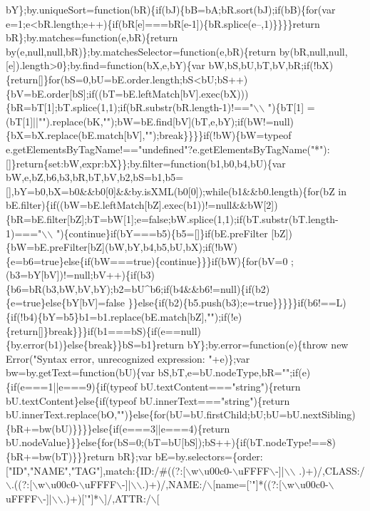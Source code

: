 \begin{DoxyCode}
{       bY\};by.uniqueSort=function(bR)\{if(bJ)\{bB=bA;bR.sort(bJ);if(bB)\{for(var e=1;e<bR.length;e++)\{if(bR[e]===bR[e-1])\{bR.splice(e--,1)\}\}\}\}return
       bR\};by.matches=function(e,bR)\{return by(e,null,null,bR)\};by.matchesSelector=function(e,bR)\{return
       by(bR,null,null,[e]).length>0\};by.find=function(bX,e,bY)\{var
       bW,bS,bU,bT,bV,bR;if(!bX)\{return[]\}for(bS=0,bU=bE.order.length;bS<bU;bS++)\{bV=bE.order[bS];if((bT=bE.leftMatch[bV].exec(bX)))\{bR=bT[1];bT.splice(1,1);if(bR.substr(bR.length-1)!=="\(\backslash\)\(\backslash\)
      ")\{bT[1]
      =(bT[1]||"").replace(bK,"");bW=bE.find[bV](bT,e,bY);if(bW!=null)\{bX=bX.replace(bE.match[bV],"");break\}\}\}\}if(!bW)\{bW=typeof
       e.getElementsByTagName!=="undefined"?e.getElementsByTagName("*"):[]\}return\{set:bW,expr:bX\}\};by.filter=function(b1,b0,b4,bU)\{var
       bW,e,bZ,b6,b3,bR,bT,bV,b2,bS=b1,b5=[],bY=b0,bX=b0&&b0[0]&&by.isXML(b0[0]);while(b1&&b0.length)\{for(bZ in
       bE.filter)\{if((bW=bE.leftMatch[bZ].exec(b1))!=null&&bW[2])\{bR=bE.filter[bZ];bT=bW[1];e=false;bW.splice(1,1);if(bT.substr(bT.length-1)==="\(\backslash\)\(\backslash\)
      ")\{continue\}if(bY===b5)\{b5=[]\}if(bE.preFilter
      [bZ])\{bW=bE.preFilter[bZ](bW,bY,b4,b5,bU,bX);if(!bW)\{e=b6=true\}else\{if(bW===true)\{continue\}\}\}if(bW)\{for(bV=0
      ;(b3=bY[bV])!=null;bV++)\{if(b3)\{b6=bR(b3,bW,bV,bY);b2=bU^b6;if(b4&&b6!=null)\{if(b2)\{e=true\}else\{bY[bV]=false
      \}\}else\{if(b2)\{b5.push(b3);e=true\}\}\}\}\}if(b6!==L)\{if(!b4)\{bY=b5\}b1=b1.replace(bE.match[bZ],"");if(!e)\{return[]\}break\}\}\}if(b1===bS)\{if(e==null)\{by.error(b1)\}else\{break\}\}bS=b1\}return bY\};by.error=function(e)\{throw new
       Error("Syntax error, unrecognized expression: "+e)\};var bw=by.getText=function(bU)\{var
       bS,bT,e=bU.nodeType,bR="";if(e)\{if(e===1||e===9)\{if(typeof bU.textContent==="string")\{return bU.textContent\}else\{if(typeof
       bU.innerText==="string")\{return
       bU.innerText.replace(bO,"")\}else\{for(bU=bU.firstChild;bU;bU=bU.nextSibling)\{bR+=bw(bU)\}\}\}\}else\{if(e===3||e===4)\{return
       bU.nodeValue\}\}\}else\{for(bS=0;(bT=bU[bS]);bS++)\{if(bT.nodeType!==8)\{bR+=bw(bT)\}\}\}return bR\};var bE=by.selectors=\{order:["ID","NAME","TAG"],match:\{ID:/#((?:[\(\backslash\)w\(\backslash\)u00c0-\(\backslash\)uFFFF\(\backslash\)-]|\(\backslash\)\(\backslash\)
      .)+)/,CLASS:/\(\backslash\).((?:[\(\backslash\)w\(\backslash\)u00c0-\(\backslash\)uFFFF\(\backslash\)-]|\(\backslash\)\(\backslash\).)+)/,NAME:/\(\backslash\)[name=['}\textcolor{stringliteral}{"]*((?:[\(\backslash\)w\(\backslash\)u00c0-\(\backslash\)uFFFF\(\backslash\)-]|\(\backslash\)\(\backslash\).)+)['"}]*\(\backslash\)]/,ATTR:/\(\backslash\)[

\end{DoxyCode}
